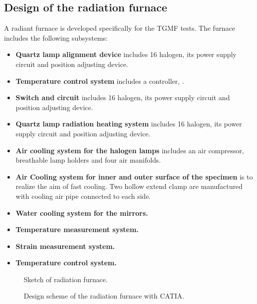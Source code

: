 \subsection{Design of the radiation furnace}
A radiant furnace is developed specifically for the TGMF tests.
The furnace includes the following subsystems:
\begin{itemize}
\item \textbf{Quartz lamp alignment device} includes 16 halogen, its power supply circuit and position adjusting device.
\item \textbf{Temperature control system} includes a controller, .
\item \textbf{Switch and circuit} includes 16 halogen, its power supply circuit and position adjusting device.

\item \textbf{Quartz lamp radiation heating system} includes 16 halogen, its power supply circuit and position adjusting device.
\item \textbf{Air cooling system for the halogen lamps} includes an air compressor, breathable lamp holders and four air manifolds.
\item \textbf{Air Cooling system for inner and outer surface of the specimen } is to realize the aim of fast cooling. Two hollow extend clamp are manufactured with cooling air pipe connected to each side.

\item \textbf{Water cooling system for the mirrors.}
\item \textbf{Temperature measurement system.}
\item \textbf{Strain measurement system.}
\item \textbf{Temperature control system.}
\end{itemize}


\begin{figure}[!htp]
\centering{}
\caption{Sketch of radiation furnace.}
\label{Fig:Radiation_Furnace}
\end{figure}

\begin{figure}[!htp]
\centering{}
\caption{Design scheme of the radiation furnace with CATIA.}
\label{Fig:DesignWithCAITA}
\end{figure}

